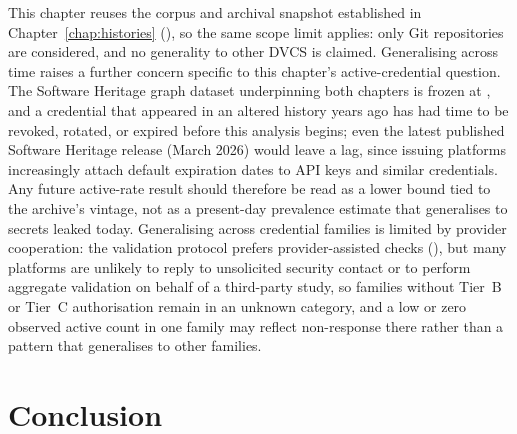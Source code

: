 This chapter reuses the corpus and archival snapshot established in Chapter~\ref{chap:histories} (), so the same scope limit applies: only Git repositories are considered, and no generality to other DVCS is claimed.
Generalising across time raises a further concern specific to this chapter's active-credential question.
The Software Heritage graph dataset underpinning both chapters is frozen at \FullDataset, and a credential that appeared in an altered history years ago has had time to be revoked, rotated, or expired before this analysis begins; even the latest published Software Heritage release (March 2026) would leave a lag, since issuing platforms increasingly attach default expiration dates to API keys and similar credentials.
Any future active-rate result should therefore be read as a lower bound tied to the archive's vintage, not as a present-day prevalence estimate that generalises to secrets leaked today.
Generalising across credential families is limited by provider cooperation: the validation protocol prefers provider-assisted checks (), but many platforms are unlikely to reply to unsolicited security contact or to perform aggregate validation on behalf of a third-party study, so families without Tier~B or Tier~C authorisation remain in an unknown category, and a low or zero observed active count in one family may reflect non-response there rather than a pattern that generalises to other families.

\section{Conclusion}
\label{sec:sec-conclusion}

